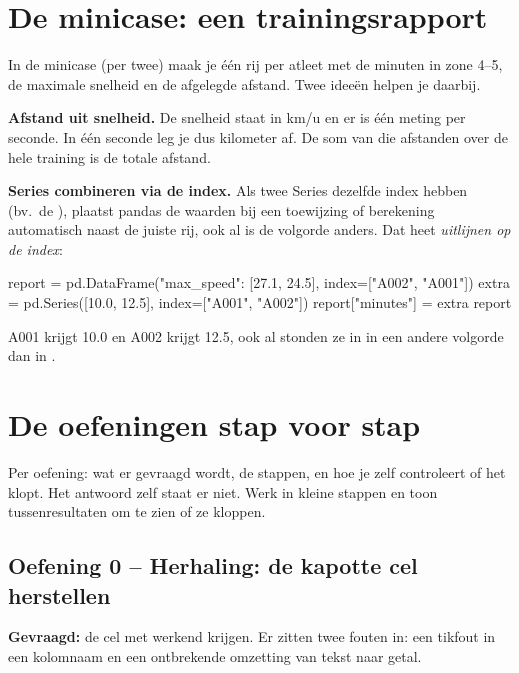 \documentclass[11pt,a4paper]{article}
\begin{document}
\section{De minicase: een trainingsrapport}

In de minicase (per twee) maak je één rij per atleet met de minuten in
zone 4--5, de maximale snelheid en de afgelegde afstand. Twee ideeën
helpen je daarbij.

\textbf{Afstand uit snelheid.} De snelheid staat in km/u en er is één
meting per seconde. In één seconde leg je dus 
kilometer af. De som van die afstanden over de hele training is de totale
afstand.

\textbf{Series combineren via de index.} Als twee Series dezelfde index
hebben (bv.\ de ), plaatst pandas de waarden bij een
toewijzing of berekening automatisch naast de juiste rij, ook al is de
volgorde anders. Dat heet \emph{uitlijnen op de index}:

\begin{python}
report = pd.DataFrame({"max_speed": [27.1, 24.5]}, index=["A002", "A001"])
extra = pd.Series([10.0, 12.5], index=["A001", "A002"])
report["minutes"] = extra
report
\end{python}

A001 krijgt 10.0 en A002 krijgt 12.5, ook al stonden ze in
 in een andere volgorde dan in .

\section{De oefeningen stap voor stap}

Per oefening: wat er gevraagd wordt, de stappen, en hoe je zelf
controleert of het klopt. Het antwoord zelf staat er niet. Werk in kleine
stappen en toon tussenresultaten om te zien of ze kloppen.

\subsection*{Oefening 0 -- Herhaling: de kapotte cel herstellen}

\textbf{Gevraagd:} de cel met  werkend krijgen. Er zitten
twee fouten in: een tikfout in een kolomnaam en een ontbrekende omzetting
van tekst naar getal.
\end{document}
